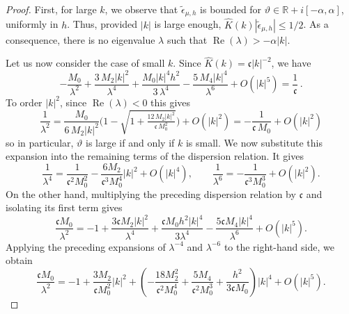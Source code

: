 \documentclass[a4paper,12pt]{amsart} %
\theoremstyle{plain}
\theoremstyle{definition}
\newcommand		{\RR}		{\mathbb R}			%
\newcommand		{\R}		{\RR}
\newcommand		{\lt}			{\left}				%
\newcommand		{\rt}			{\right}			%
\renewcommand	{\(}			{\lt(}
\renewcommand	{\)}			{\rt)}
\newcommand		{\n}[1]			{\lt\lvert{#1}\rt\rvert}	%
\DeclareMathOperator{\re}		{Re}				%
\renewcommand	{\Re}[1]		{\re\!\( #1 \)}		%
\newcommand	{\h}			{h}
\newcommand		{\CK}			{\mathfrak{c}}	%
\begin{document}
\begin{proof}
		First, for large $k$, we observe that $\tilde\epsilon_{\mu,\h}$ is bounded for $\vartheta\in \R + i \lt[-\alpha, \alpha\rt]$, uniformly in $\h$. Thus, provided $\n{k}$ is large enough, $\widehat{K}(k) \n{\tilde\epsilon_{\mu,\h}} \leq 1/2$. As a consequence, there is no eigenvalue $\lambda$ such that $\Re \lambda > - \alpha \n{k}$.
	
		Let us now consider the case of small $k$. Since $\widehat{K}(k) = \CK \n{k}^{-2}$, we have
		\begin{equation*}
			-\frac{M_0}{\lambda^2} + \frac{3\,M_2\n{k}^2}{\lambda^4} + \frac{M_0\n{k}^4 h^2}{3\,\lambda^4} - \frac{5\,M_4\n{k}^4}{\lambda^6}+ O(\n{k}^5) = \frac{1}{\CK} \, .
		\end{equation*}
		To order $\n{k}^2$, since $\Re{\lambda}<0$ this gives
		\begin{equation*}
			\frac{1}{\lambda^2} = \frac{M_0}{6\,M_2\n{k}^2} \Big(1 - \sqrt{1+\tfrac{12\,M_2\n{k}^2}{\CK\,M_0^2}}\Big) + O(\n{k}^2) = - \frac{1}{\CK\,M_0} + O(\n{k}^2)
		\end{equation*}
		so in particular, $\vartheta$ is large if and only if $k$ is small. 
		We now substitute this expansion into the remaining terms of the
		dispersion relation. It gives
		\begin{equation*}
			\frac{1}{\lambda^4}
			=\frac{1}{\CK^2M_0^2}
			-\frac{6M_2}{\CK^3M_0^4}\n{k}^2
			+O(\n{k}^4),
			\qquad
			\frac{1}{\lambda^6}
			=-\frac{1}{\CK^3M_0^3}+O(\n{k}^2).
		\end{equation*}
		On the other hand, multiplying the preceding dispersion relation by
		$\CK$ and isolating its first term gives
		\begin{equation*}
			\frac{\CK M_0}{\lambda^2}
			=-1
			+\frac{3\CK M_2\n{k}^2}{\lambda^4}
			+\frac{\CK M_0h^2\n{k}^4}{3\lambda^4}
			-\frac{5\CK M_4\n{k}^4}{\lambda^6}
			+O(\n{k}^5).
		\end{equation*}
		Applying the preceding expansions of $\lambda^{-4}$ and
		$\lambda^{-6}$ to the right-hand side, we obtain
		\begin{equation*}
			\frac{\CK M_0}{\lambda^2}
			=-1+\frac{3M_2}{\CK M_0^2}\n{k}^2
			+	{\left(
			-\frac{18M_2^2}{\CK^2M_0^4}
			+\frac{5M_4}{\CK^2M_0^3}
			+\frac{h^2}{3\CK M_0}
			\right)\n{k}^4}+O(\n{k}^5).
		\end{equation*}
		

\end{proof}
\end{document}
